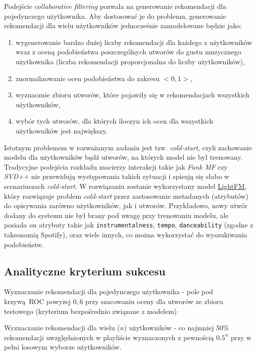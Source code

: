 \documentclass[10pt,a4paper]{article}
\begin{document}
Podejście \textit{collaborative filtering} pozwala na generowanie rekomendacji dla pojedynczego użytkownika. Aby dostosować je do problemu, generowanie rekomendacji dla wielu użytkowników jednocześnie zamodelowane będzie jako:
\begin{enumerate}

\item wygenerowanie bardzo dużej liczby rekomendacji dla każdego z użytkowników wraz z oceną podobieństwa poszczególnych utworów do gustu muzycznego użytkownika (liczba rekomendacji proporcjonalna do liczby użytkowników),
\item znormalizowanie ocen podobieństwa do zakresu $<0, 1>$,
\item wyznacznie zbioru utworów, które pojawiły się w rekomendacjach wszystkich użytkowników,
\item wybór tych utworów, dla których iloczyn ich ocen dla wszystkich użytkowników jest największy.

\end{enumerate}

Istotnym problemem w rozważanym zadaniu jest tzw. \textit{cold-start}, czyli zachowanie modelu dla użytkowników bądź utworów, na których model nie był trenowany. Tradycyjne podejścia rozkładu macierzy interakcji takie jak \textit{Funk MF} czy \textit{SVD++} nie przewidują występowania takich sytuacji i spisują się słabo w scenariuszach \textit{cold-start}. W rozwiązaniu zostanie wykorzystany model \href{https://arxiv.org/pdf/1507.08439.pdf}{LightFM}, który rozwiązuje problem \textit{cold-start} przez zastosowanie metadanych (atrybutów) do opisywania zarówno użytkowników, jak i utworów. Przykładowo, nowy utwór dodany do systemu nie był brany pod uwagę przy trenowaniu modelu, ale posiada on atrybuty takie jak \texttt{instrumentalness}, \texttt{tempo}, \texttt{danceability} (zgodne z taksonomią Spotify), oraz wiele innych, co można wykorzystać do wyszukiwania podobieństw. 

\subsection*{Analityczne kryterium sukcesu}

Wyznaczanie rekomendacji dla pojedynczego użytkownika - pole pod krzywą ROC powyżej $0,6$ przy szacowaniu oceny dla utworów ze zbioru testowego (kryterium bezpośrednio związane z modelem)

Wyznaczanie rekomendacji dla wielu ($n$) użytkowników - co najmniej $50\%$ rekomendacji uwzględnionych w playliście wyznaczonych z pewnością $0.5^n$ przy w pełni losowym wyborze użytkowników.
\end{document}
